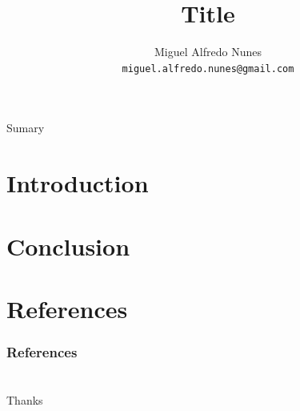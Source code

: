 \documentclass[hyperref={hidelinks}]{beamer}
\title{Title}
\author{Miguel Alfredo Nunes \\ \small{\texttt{miguel.alfredo.nunes@gmail.com}}}
\date{}
\begin{document}
    \begin{frame}
        \titlepage
    \end{frame}

    \begin{frame}{Sumary}
        \tableofcontents
    \end{frame}

    \section{Introduction}
    \label{sec:introduction}
        
        \SecT
        

    \section{Conclusion}
        \label{sec:conclusion}

        \SecT

        

    \section{References}
        \label{sec:references}

        \SecT

        \begin{frame}[allowframebreaks]
            \frametitle{References}

            
            
        \end{frame}

    \section*{}
    \begin{frame}{}

        \begin{center}
            {\Huge Thanks}
            
            \vspace{\baselineskip}

            \vspace{\baselineskip}
            
            \insertauthor
        \end{center}
        
    \end{frame}
\end{document}
